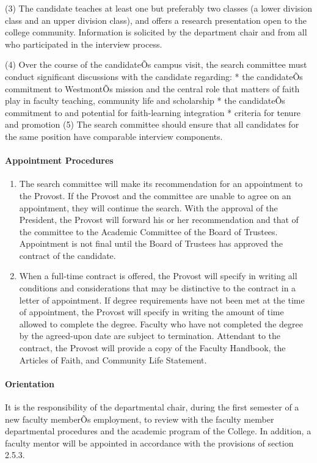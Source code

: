 \documentclass[letterpaper, 11pt]{article}
\begin{document}
\begin{enumerate}[label=\alph*)]
					(3) The candidate teaches at least one but preferably two classes (a lower division class and an upper division class), and offers a research presentation open to the college community.  Information is solicited by the department chair and from all who participated in the interview process.

					(4) Over the course of the candidateÕs campus visit, the search committee must conduct significant discussions with the candidate regarding:
					* the candidateÕs commitment to WestmontÕs mission and the central role that matters of faith play in faculty teaching, community life and scholarship
					* the candidateÕs commitment to and potential for faith-learning integration
					* criteria for tenure and promotion
					(5) The search committee should ensure that all candidates for the same position have comparable interview components.
				\end{enumerate}

			\paragraph{Appointment Procedures}

				\begin{enumerate}[label=\alph*)]
					\item{The search committee will make its recommendation for an appointment to the Provost.  If the Provost and the committee are unable to agree on an appointment, they will continue the search.  With the approval of the President, the Provost will forward his or her recommendation and that of the committee to the Academic Committee of the Board of Trustees.  Appointment is not final until the Board of Trustees has approved the contract of the candidate.}
					\item{When a full-time contract is offered, the Provost will specify in writing all conditions and considerations that may be distinctive to the contract in a letter of appointment.  If degree requirements have not been met at the time of appointment, the Provost will specify in writing the amount of time allowed to complete the degree.  Faculty who have not completed the degree by the agreed-upon date are subject to termination.  Attendant to the contract, the Provost will provide a copy of the Faculty Handbook, the Articles of Faith, and Community Life Statement.}
				\end{enumerate}
			\paragraph{Orientation}
				It is the responsibility of the departmental chair, during the first semester of a new faculty memberÕs employment, to review with the faculty member departmental procedures and the academic program of the College.  In addition, a faculty mentor will be appointed in accordance with the provisions of section 2.5.3.
\end{document}
